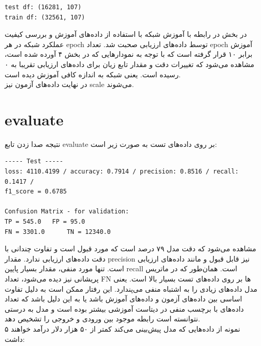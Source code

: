 \documentclass{article}
\begin{document}
\begin{latin}
\begin{lstlisting}
test df: (16281, 107)
train df: (32561, 107)
\end{lstlisting}
\end{latin}

در بخش در رابطه با آموزش شبکه با استفاده از داده‌های آموزش و بررسی کیفیت عملکرد شبکه در هر epoch توسط داده‌های ارزیابی صحبت شد. تعداد epoch آموزش برابر ۱۰ قرار گرفته است که با توجه به نمودارهایی که در بخش ۴ آورده شده است، مشاهده می‌شود که تغییرات دقت و مقدار تابع زیان برای داده‌های ارزیابی تقریبا به ۰ رسیده است. یعنی شبکه به اندازه کافی آموزش دیده است. \\

در نهایت داده‌های آزمون نیز scale می‌شوند.





\section{
evaluate
}

نتیجه صدا زدن تابع evaluate بر روی داده‌های تست به صورت زیر است:

\begin{latin}
\begin{lstlisting}
----- Test -----
loss: 4110.4199 / accuracy: 0.7914 / precision: 0.8516 / recall: 0.1417 / 
f1_score = 0.6785

Confusion Matrix - for validation:
TP = 545.0 	 FP = 95.0
FN = 3301.0 	 TN = 12340.0
\end{lstlisting}
\end{latin}

مشاهده می‌شود که دقت مدل ۷۹ درصد است که مورد قبول است و تفاوت چندانی با دقت داده‌های ارزیابی ندارد. مقدار precision نیز قابل قبول و مانند داده‌های ارزیابی است. تنها مورد منفی، مقدار بسیار پایین recall است. همان‌طور که در ماتریس پریشانی نیز دیده می‌شود، تعداد FN ها بر روی داده‌های تست بسیار بالا است. یعنی مدل داده‌های زیادی را به اشتباه منفی می‌پندارد. این رفتار ممکن است به دلیل تفاوت اساسی بین داده‌های آزمون و داده‌های آموزش باشد یا به این دلیل باشد که تعداد‌ داده‌های با برچسب منفی در دیتاست آموزشی بیشتر بوده است و مدل به درستی نتوانسته است رابطه موجود بین ورودی و خروجی را تشخیص دهد. \\

۵ نمونه‌ از داده‌هایی که مدل پیش‌بینی می‌کند کمتر از ۵۰ هزار دلار درآمد خواهند داشت:
\end{document}
